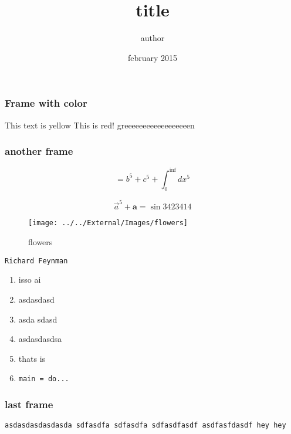 \documentclass{beamer}
\begin{document}
\title{title}
\author{author}
\date{february 2015}
\begin{frame}
\titlepage
\end{frame}
\maketitle



\begin{frame}\frametitle{Frame with color}
{\color{yellow}This text is yellow} 
 {\color{red}This is red!} 
 {\color{green}greeeeeeeeeeeeeeeeeen} 

 \begin{center}\end{center}
\end{frame}

\begin{frame}\frametitle{another frame}
\begin{equation}\label{a^5}
= b^5 + c^5 + \int^{\inf}_{0}dx^5
\end{equation} 

$$\vec{a}^5 + \mathbf{a} = \sin{3423414}$$

 \begin{figure}[H]
\centering
\texttt{[image: ../../External/Images/flowers]}
\caption{flowers}
\end{figure}
 

 {\tt Richard Feynman} 

 \begin{enumerate}
\item isso ai
\item asdasdasd
\item asda
sdasd
\item asdasdasdsa
\item thats is
\item \lstset{language=haskell}
\begin{lstlisting}[frame=none]
main = do...
\end{lstlisting}
\end{enumerate}
\end{frame}

\begin{frame}\frametitle{last frame}
{\tt asdasdasdasdasda
sdfasdfa
sdfasdfa
sdfasdfasdf
asdfasfdasdf hey hey}
\end{frame}
\end{document}
